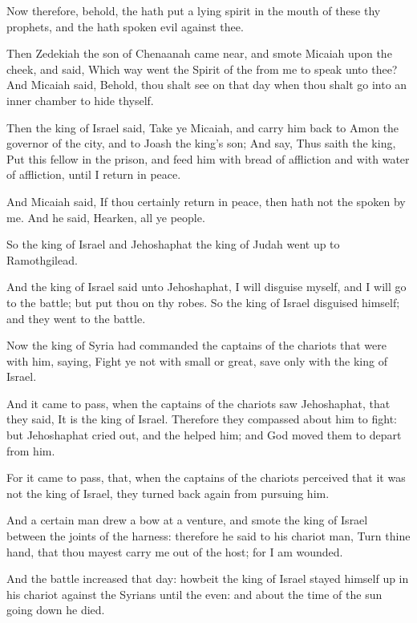 \Verse Now therefore, behold, the \LORD hath put a lying spirit in the mouth of these thy prophets, and the \LORD hath spoken evil against thee.

\Verse Then Zedekiah the son of Chenaanah came near, and smote Micaiah upon the cheek, and said, Which way went the Spirit of the \LORD from me to speak unto thee?  \Verse And Micaiah said, Behold, thou shalt see on that day when thou shalt go into an inner chamber to hide thyself.

\Verse Then the king of Israel said, Take ye Micaiah, and carry him back to Amon the governor of the city, and to Joash the king's son; \Verse And say, Thus saith the king, Put this fellow in the prison, and feed him with bread of affliction and with water of affliction, until I return in peace.

\Verse And Micaiah said, If thou certainly return in peace, then hath not the \LORD spoken by me. And he said, Hearken, all ye people.

\Verse So the king of Israel and Jehoshaphat the king of Judah went up to Ramothgilead.

\Verse And the king of Israel said unto Jehoshaphat, I will disguise myself, and I will go to the battle; but put thou on thy robes. So the king of Israel disguised himself; and they went to the battle.

\Verse Now the king of Syria had commanded the captains of the chariots that were with him, saying, Fight ye not with small or great, save only with the king of Israel.

\Verse And it came to pass, when the captains of the chariots saw Jehoshaphat, that they said, It is the king of Israel. Therefore they compassed about him to fight: but Jehoshaphat cried out, and the \LORD helped him; and God moved them to depart from him.

\Verse For it came to pass, that, when the captains of the chariots perceived that it was not the king of Israel, they turned back again from pursuing him.

\Verse And a certain man drew a bow at a venture, and smote the king of Israel between the joints of the harness: therefore he said to his chariot man, Turn thine hand, that thou mayest carry me out of the host; for I am wounded.

\Verse And the battle increased that day: howbeit the king of Israel stayed himself up in his chariot against the Syrians until the even: and about the time of the sun going down he died.


